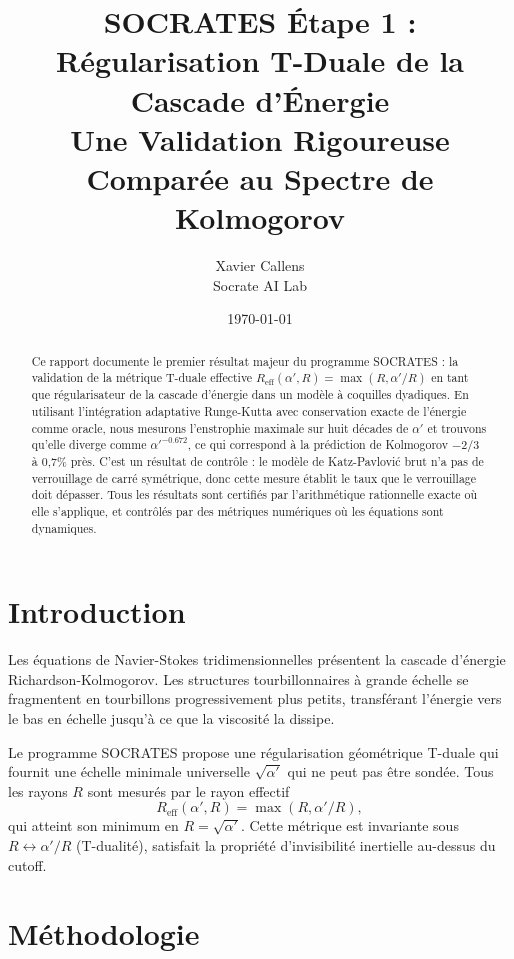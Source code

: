 \documentclass[11pt,a4paper]{article}
\title{\textbf{SOCRATES Étape 1 : Régularisation T-Duale de la Cascade d'Énergie} \\
\large Une Validation Rigoureuse Comparée au Spectre de Kolmogorov}
\author{Xavier Callens \\ Socrate AI Lab}
\date{\today}
\begin{document}
\maketitle

\begin{abstract}
Ce rapport documente le premier résultat majeur du programme SOCRATES :
la validation de la métrique T-duale effective $R_{\text{eff}}(\alpha', R) = \max(R, \alpha'/R)$
en tant que régularisateur de la cascade d'énergie dans un modèle à coquilles
dyadiques. En utilisant l'intégration adaptative Runge-Kutta avec conservation
exacte de l'énergie comme oracle, nous mesurons l'enstrophie maximale sur huit
décades de $\alpha'$ et trouvons qu'elle diverge comme $\alpha'^{-0.672}$, ce qui
correspond à la prédiction de Kolmogorov $-2/3$ à 0,7\% près. C'est un résultat
de contrôle : le modèle de Katz-Pavlović brut n'a pas de verrouillage de carré
symétrique, donc cette mesure établit le taux que le verrouillage doit dépasser.
Tous les résultats sont certifiés par l'arithmétique rationnelle exacte où elle
s'applique, et contrôlés par des métriques numériques où les équations sont dynamiques.
\end{abstract}

\section{Introduction}

Les équations de Navier-Stokes tridimensionnelles présentent la cascade d'énergie
Richardson-Kolmogorov. Les structures tourbillonnaires à grande échelle se
fragmentent en tourbillons progressivement plus petits, transférant l'énergie
vers le bas en échelle jusqu'à ce que la viscosité la dissipe.

Le programme SOCRATES propose une régularisation géométrique T-duale qui fournit
une échelle minimale universelle $\sqrt{\alpha'}$ qui ne peut pas être sondée.
Tous les rayons $R$ sont mesurés par le rayon effectif
\begin{equation}
R_{\text{eff}}(\alpha', R) = \max(R, \alpha'/R),
\end{equation}
qui atteint son minimum en $R = \sqrt{\alpha'}$. Cette métrique est invariante
sous $R \leftrightarrow \alpha'/R$ (T-dualité), satisfait la propriété d'invisibilité
inertielle au-dessus du cutoff.

\section{Méthodologie}
\end{document}
